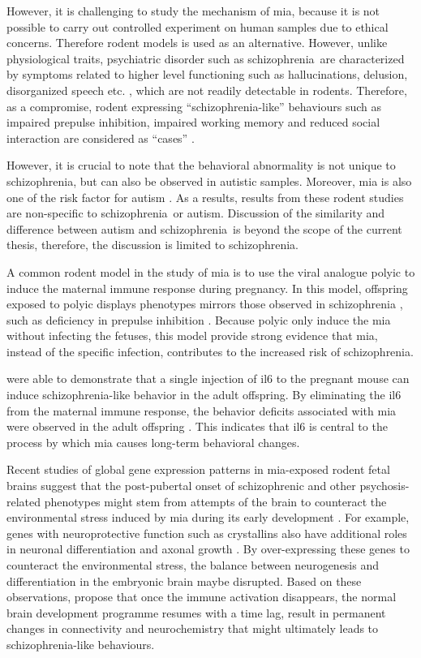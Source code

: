 \documentclass[12pt]{scrbook}
\newcommand*{\scz}{schizophrenia}
\begin{document}
However, it is challenging to study the mechanism of \gls{mia}, because it is not possible to carry out controlled experiment on human samples due to ethical concerns.
Therefore rodent models is used as an alternative.
However, unlike physiological traits, psychiatric disorder such as \scz\ are characterized by symptoms related to higher level functioning such as hallucinations, delusion, disorganized speech etc. \citep{AmericanPsychiatricAssociation2013}, which are not readily detectable in rodents.
Therefore, as a compromise, rodent expressing ``\scz-like'' behaviours such as impaired prepulse inhibition, impaired working memory and reduced social interaction are considered as ``cases'' \citep{Meyer2007a}.

However, it is crucial to note that the behavioral abnormality is not unique to \scz, but can also be observed in autistic samples.
Moreover, \gls{mia} is also one of the risk factor for autism \citep{Brown2012}.
As a results, results from these rodent studies are non-specific to \scz\ or autism.
Discussion of the similarity and difference between autism and \scz\ is beyond the scope of the current thesis, therefore, the discussion is limited to \scz.

A common rodent model in the study of \gls{mia} is to use the viral analogue \gls{polyic} to induce the maternal immune response during pregnancy.
In this model, offspring exposed to \gls{polyic} displays phenotypes mirrors those observed in schizophrenia \citep{Li2009c,Meyer2009b,Li2010a}, such as deficiency in prepulse inhibition \citep{Cadenhead2000}.
Because \gls{polyic} only induce the \gls{mia} without infecting the fetuses, this model provide strong evidence that \gls{mia}, instead of the specific infection, contributes to the increased risk of \scz.	
	
\citet{Smith2007} were able to demonstrate that a single injection of \gls{il6} to the pregnant mouse can induce \scz-like behavior in the adult offspring. 
By eliminating the \gls{il6} from the maternal immune response, the behavior deficits associated with \gls{mia} were observed in the adult offspring \citep{Smith2007}.
This indicates that \gls{il6} is central to the process by which \gls{mia} causes long-term behavioral changes.

Recent studies of global gene expression patterns in \gls{mia}-exposed rodent fetal brains \citep{Oskvig2012,Garbett2012a} suggest that the post-pubertal onset of schizophrenic and other psychosis-related phenotypes might stem from attempts of the brain to counteract the environmental stress induced by \gls{mia} during its early development \citep{Garbett2012a}.
For example, genes with neuroprotective function such as crystallins also have additional roles in neuronal differentiation and axonal growth \citep{Garbett2012a}. 
By over-expressing these genes to counteract the environmental stress, the balance between neurogenesis and differentiation in the embryonic brain maybe disrupted. 
Based on these observations, \citet{Garbett2012a} propose that once the immune activation disappears, the normal brain development programme resumes with a time lag, result in permanent changes in connectivity and neurochemistry that might ultimately leads to \scz-like behaviours.
\end{document}
